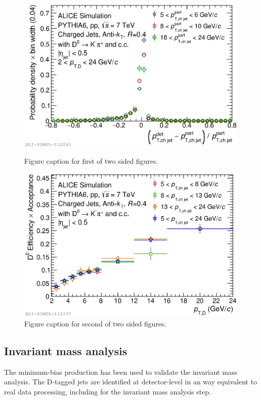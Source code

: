 \documentclass[a4paper]{jpconf}
\begin{document}
\begin{figure}[h]
\centering
\begin{minipage}{.48\textwidth}
\includegraphics[width=\textwidth]{img/HQ16_Simulation_DetectorResponse}
\caption{\label{label}Figure caption for first of two sided figures.}
\end{minipage}\hspace{1pc}%
\begin{minipage}{.48\textwidth}
\includegraphics[width=\textwidth]{img/HQ16_Simulation_EfficiencyVsDPt}
\caption{\label{label}Figure caption for second of two sided figures.}
\end{minipage} 
\end{figure}

\subsection{Invariant mass analysis}
The minimum-bias production has been used to validate the invariant mass analysis. 
The D-tagged jets are identified at detector-level in an way equivalent to real data processing, including for the invariant mass analysis step.
\end{document}
